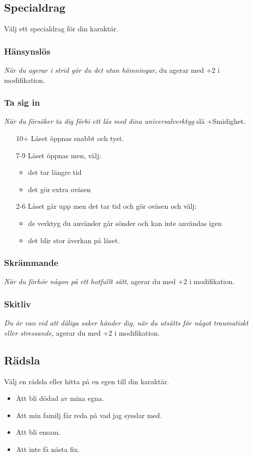 \subsection{Specialdrag}
Välj ett specialdrag för din karaktär.
\subsubsection{Hänsynslös}
\textit{När du agerar i strid gör du det utan hämningar}, du agerar med +2 i modifikation.
\subsubsection{Ta sig in}
\textit{När du försöker ta dig förbi ett lås med dina universalverktyg} slå +Smidighet.
\begin{itemize}
  \item[10+] Låset öppnas snabbt och tyst.
  \item[7-9] Låset öppnas men, välj:
  \begin{itemize}
    \item det tar längre tid
    \item det gör extra oväsen
  \end{itemize}
  \item[2-6] Låset går upp men det tar tid och gör oväsen och välj:
  \begin{itemize}
    \item de verktyg du använder går sönder och kan inte användas igen
    \item det blir stor åverkan på låset.
  \end{itemize}
\end{itemize}
\subsubsection{Skrämmande}
\textit{När du förhör någon på ett hotfullt sätt}, agerar du med +2 i modifikation.
\subsubsection{Skitliv}
\textit{Du är van vid att dåliga saker händer dig, när du utsätts för något traumatiskt eller stressande}, agerar du med +2 i modifikation.
\subsection{Rädsla}
Välj en rädsla eller hitta på en egen till din karaktär.
\begin{itemize}
  \item Att bli dödad av mina egna.
  \item Att min familj får reda på vad jag sysslar med.
  \item Att bli ensam.
  \item Att inte få nästa fix.
\end{itemize}
